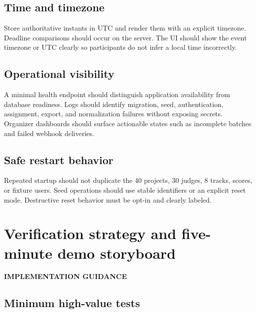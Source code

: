 \documentclass[11pt]{article}
\newcommand{\advisory}{\textcolor{DeepBlue}{\textbf{IMPLEMENTATION GUIDANCE}}}
\begin{document}
\subsection{Time and timezone}

Store authoritative instants in UTC and render them with an explicit timezone. Deadline comparisons should occur on the server. The UI should show the event timezone or UTC clearly so participants do not infer a local time incorrectly.

\subsection{Operational visibility}

A minimal health endpoint should distinguish application availability from database readiness. Logs should identify migration, seed, authentication, assignment, export, and normalization failures without exposing secrets. Organizer dashboards should surface actionable states such as incomplete batches and failed webhook deliveries.

\subsection{Safe restart behavior}

Repeated startup should not duplicate the 40 projects, 30 judges, 8 tracks, scores, or fixture users. Seed operations should use stable identifiers or an explicit reset mode. Destructive reset behavior must be opt-in and clearly labeled.

\section{Verification strategy and five-minute demo storyboard}

\advisory\par


\subsection{Minimum high-value tests}
\end{document}
